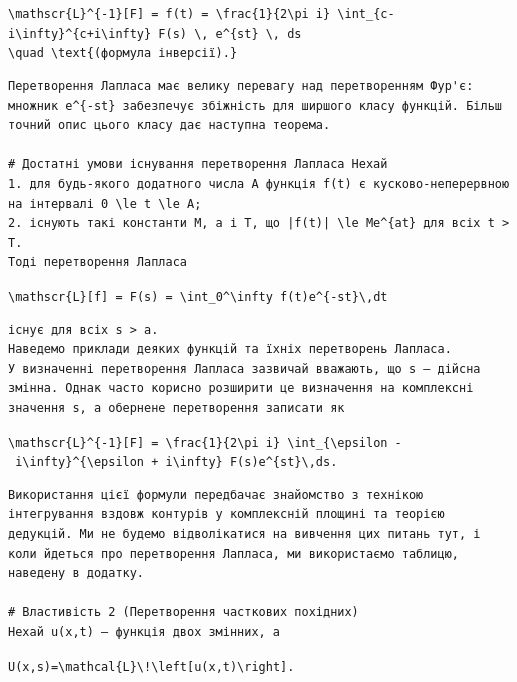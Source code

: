 \documentclass[
  ukrainian,
]{article}
\begin{document}
\texttt{\textbackslash{}mathscr\{L\}\^{}\{-1\}{[}F{]}\ =\ f(t)\ =\ \textbackslash{}frac\{1\}\{2\textbackslash{}pi\ i\}\ \textbackslash{}int\_\{c-i\textbackslash{}infty\}\^{}\{c+i\textbackslash{}infty\}\ F(s)\ \textbackslash{},\ e\^{}\{st\}\ \textbackslash{},\ ds}
\texttt{\textbackslash{}quad\ \textbackslash{}text\{(формула\ інверсії).\}}

\begin{verbatim}
Перетворення Лапласа має велику перевагу над перетворенням Фур'є: множник e^{-st} забезпечує збіжність для ширшого класу функцій. Більш точний опис цього класу дає наступна теорема.

# Достатні умови існування перетворення Лапласа Нехай
1. для будь-якого додатного числа A функція f(t) є кусково-неперервною на інтервалі 0 \le t \le A;
2. існують такі константи M, a і T, що |f(t)| \le Me^{at} для всіх t > T.
Тоді перетворення Лапласа
\end{verbatim}

\texttt{\textbackslash{}mathscr\{L\}{[}f{]}\ =\ F(s)\ =\ \textbackslash{}int\_0\^{}\textbackslash{}infty\ f(t)e\^{}\{-st\}\textbackslash{},dt}

\begin{verbatim}
існує для всіх s > a.
Наведемо приклади деяких функцій та їхніх перетворень Лапласа.
У визначенні перетворення Лапласа зазвичай вважають, що s — дійсна змінна. Однак часто корисно розширити це визначення на комплексні значення s, а обернене перетворення записати як
\end{verbatim}

\texttt{\textbackslash{}mathscr\{L\}\^{}\{-1\}{[}F{]}\ =\ \textbackslash{}frac\{1\}\{2\textbackslash{}pi\ i\}\ \textbackslash{}int\_\{\textbackslash{}epsilon\ -\ i\textbackslash{}infty\}\^{}\{\textbackslash{}epsilon\ +\ i\textbackslash{}infty\}\ F(s)e\^{}\{st\}\textbackslash{},ds.}

\begin{verbatim}
Використання цієї формули передбачає знайомство з технікою інтегрування вздовж контурів у комплексній площині та теорією дедукцій. Ми не будемо відволікатися на вивчення цих питань тут, і коли йдеться про перетворення Лапласа, ми використаємо таблицю, наведену в додатку.

# Властивість 2 (Перетворення часткових похідних)
Нехай u(x,t) — функція двох змінних, а
\end{verbatim}

\texttt{U(x,s)=\textbackslash{}mathcal\{L\}\textbackslash{}!\textbackslash{}left{[}u(x,t)\textbackslash{}right{]}.}
\end{document}
